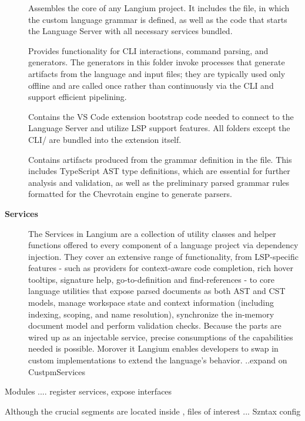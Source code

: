 \begin{description}
  \item[] Assembles the core of any Langium project. It includes the  file, in which the custom language grammar is defined, as well as the code that starts the Language Server with all necessary services bundled.
  \item[] Provides functionality for CLI interactions, command parsing, and generators. The generators in this folder invoke processes that generate artifacts from the language and input files;
  they are typically used only offline and are called once rather than continuously via the CLI and support efficient pipelining.
  \item[] Contains the VS Code extension bootstrap code needed to connect to the Language Server and utilize LSP support features. All folders except the CLI/ are bundled into the extension itself.
  \item[] Contains artifacts produced from the grammar definition in the  file. This includes TypeScript AST type definitions, which are essential for further analysis and validation, as well as the preliminary parsed grammar rules formatted for the Chevrotain engine to generate parsers.
  \item[\textbf{Services}] The Services in Langium are a collection of utility classes and helper functions offered to every component of a language project via dependency injection. They cover an extensive range of functionality, from LSP-specific features - such as providers for context-aware code completion, rich hover tooltips, signature help, go-to-definition and find-references - to core language utilities that expose parsed documents as both AST and CST models, manage workspace state and context information (including indexing, scoping, and name resolution), synchronize the in-memory document model and perform validation checks. Because the parts are wired up as an injectable service, precise consumptions of the capabilities needed is possible. Morover it Langium enables developers to swap in custom implementations to extend the language's behavior. ..expand on CustpmServices
\end{description}


Modules  .... register services, expose interfaces

Although the crucial segments are located inside , files of interest ... Szntax config

